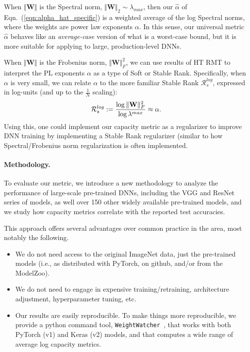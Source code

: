 When $\Vert\mathbf{W}\Vert$ is the Spectral norm, $\Vert\mathbf{W}\Vert_{2}\sim\lambda_{max}$, then our $\hat{\alpha}$ of Eqn.~(\ref{eqn:alpha_hat_specific}) is a weighted average of the log Spectral norms, where the weights are power law exponents $\alpha$. 
In this sense, our universal metric $\hat{\alpha}$ behaves like an \emph{average-case} version of what is a worst-case bound, but it is more suitable for applying to large, production-level DNNs.
 
When $\Vert\mathbf{W}\Vert$ is the Frobenius norm, $\Vert\mathbf{W}\Vert^{2}_{F}$, we can use results of HT RMT to interpret the PL exponents $\alpha$ as a type of Soft or Stable Rank. 
Specifically, when $\alpha$ is very small, we can relate $\alpha$ to the more familiar Stable Rank $\mathcal{R}^{log}_{s}$, expressed in log-units (and up to the $\frac{1}{N}$ scaling):
\vspace{-2mm}
\begin{equation}
\mathcal{R}^{log}_{s}:=\dfrac{\log\Vert\mathbf{W}\Vert^{2}_{F}}{\log\lambda^{max}}  \approx \alpha  .
\vspace{-1mm}
\end{equation}
Using this, one could implement our capacity metric as a regularizer to improve DNN training by implementing a Stable Rank regularizer (similar to how Spectral/Frobenius norm regularization is often implemented.  %


\vspace{-2mm}
\paragraph{Methodology.} 
To evaluate our metric, we introduce a new methodology to analyze the performance of large-scale pre-trained DNNs, including the VGG and ResNet series of models, as well over 150 other widely available pre-trained models, and we study how capacity metrics correlate with the reported test accuracies.
 
This approach offers several advantages over common practice in the area, most notably the following.
\begin{itemize}
\item 
We do not need access to the original ImageNet data, just the pre-trained models (i.e., as distributed with PyTorch, on github, and/or from the ModelZoo).
\item
We do not need to engage in expensive training/retraining, architecture adjustment, hyperparameter tuning, etc.
\item 
Our results are easily reproducible.
To make things more reproducible, we provide a python command tool, \texttt{WeightWatcher}~\cite{weightwatcher_package_justURL}, that works with both PyTorch (v1) and Keras (v2) models, and that computes a wide range of average log capacity metrics.
\end{itemize}
 
